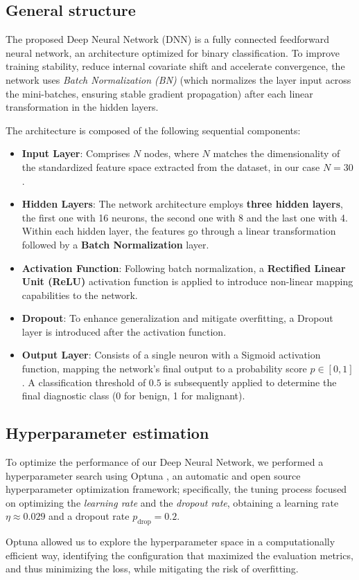 \documentclass[prl,twocolumn]{revtex4-2}
\begin{document}
\subsection{General structure}
The proposed Deep Neural Network (DNN) is a fully connected feedforward neural network, an architecture optimized for binary classification.
To improve training stability, reduce internal covariate shift and accelerate convergence, the network uses \textit{Batch Normalization (BN)} (which normalizes the layer input across the mini-batches, ensuring stable gradient propagation) after each linear transformation in the hidden layers. \par
The architecture is composed of the following sequential components:
\begin{itemize}
    \item \textbf{Input Layer}: Comprises $N$ nodes, where $N$ matches the dimensionality of the standardized feature space extracted from the dataset, in our case \textbf{$N=30$}.
    \item \textbf{Hidden Layers}: The network architecture employs \textbf{three hidden layers}, the first one with 16 neurons, the second one with 8 and the last one with 4. 
    Within each hidden layer, the features go through a linear transformation followed by a \textbf{Batch Normalization} layer.
    \item \textbf{Activation Function}: Following batch normalization, a \textbf{Rectified Linear Unit (ReLU)} activation function is applied to introduce non-linear mapping capabilities to the network.
    \item \textbf{Dropout}: To enhance generalization and mitigate overfitting, a Dropout layer is introduced after the activation function.
    \item \textbf{Output Layer}: Consists of a single neuron with a Sigmoid activation function, mapping the network's final output to a probability score $p \in [0, 1]$. A classification threshold of $0.5$ is subsequently applied to determine the final diagnostic class (0 for benign, 1 for malignant).
\end{itemize}


\subsection{Hyperparameter estimation}
To optimize the performance of our Deep Neural Network, we performed a hyperparameter search using Optuna \cite{optuna}, an automatic and open source hyperparameter optimization framework;
specifically, the tuning process focused on optimizing the \textit{learning rate} and the \textit{dropout rate}, obtaining a learning rate $\eta \approx 0.029$ and a dropout rate $p_\text{drop} = 0.2$. \par
Optuna allowed us to explore the hyperparameter space in a computationally efficient way, identifying the configuration that maximized the evaluation metrics, and thus minimizing the loss, while mitigating the risk of overfitting. 
\end{document}
